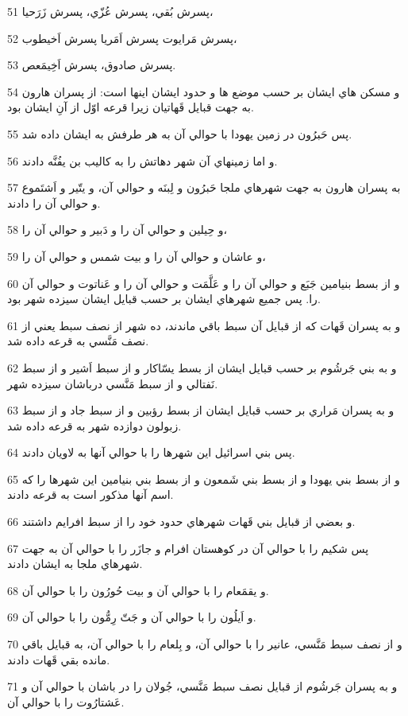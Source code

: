 \par 51 پسرش بُقي، پسرش عُزّي، پسرش زَرَحيا،
\par 52 پسرش مَرايوت پسرش اَمَريا پسرش اَخيطوب،
\par 53 پسرش صادوق، پسرش اَخِيمَعص.
\par 54 و مسکن هاي ايشان بر حسب موضع ها و حدود ايشان اينها است: از پسران هارون به جهت قبايل قَهاتيان زيرا قرعه اوّل از آنِ ايشان بود.
\par 55 پس حَبرُون در زمين يهودا با حوالي آن به هر طرفش به ايشان داده شد.
\par 56 و اما زمينهاي آن شهر دهاتش را به کاليب بن يفُنَّه دادند.
\par 57 به پسران هارون به جهت شهرهاي ملجا حَبرُون و لِبنَه و حوالي آن، و يتّير و اَشتَموع و حوالي آن را دادند.
\par 58 و حِيلين و حوالي آن را و دَبير و حوالي آن را،
\par 59 و عاشان و حوالي آن را و بيت شمس و حوالي آن را،
\par 60 و از بسط بنيامين جَبَع و حوالي آن را و عَلَّمَت و حوالي آن را و عَناتوت و حوالي آن را. پس جميع شهرهاي ايشان بر حسب قبايل ايشان سيزده شهر بود.
\par 61 و به پسران قَهات که از قبايل آن سبط باقي ماندند، ده شهر از نصف سبط يعني از نصف مَنَّسي به قرعه داده شد.
\par 62 و به بني جَرشُوم بر حسب قبايل ايشان از بسط يسّاکار و از سبط اَشير و از سبط نَفتالي و از سبط مَنَّسي درباشان سيزده شهر.
\par 63 و به پسران مَراري بر حسب قبايل ايشان از بسط رؤبين و از سبط جاد و از سبط زبولون دوازده شهر به قرعه داده شد.
\par 64 پس بني اسرائيل اين شهرها را با حوالي آنها به لاويان دادند.
\par 65 و از بسط بني يهودا و از بسط بني شَمعون و از بسط بني بنيامين اين شهرها را که اسم آنها مذکور است به قرعه دادند.
\par 66 و بعضي از قبايل بني قَهات شهرهاي حدود خود را از سبط افرايم داشتند.
\par 67 پس شکيم را با حوالي آن در کوهستان افرام و جازَر را با حوالي آن به جهت شهرهاي ملجا به ايشان دادند.
\par 68 و يقمَعام را با حوالي آن و بيت حُورُون را با حوالي آن.
\par 69 و اَيلُون را با حوالي آن و جَتّ رِمُّون را با حوالي آن.
\par 70 و از نصف سبط مَنَّسي، عانير را با حوالي آن، و بِلعام را با حوالي آن، به قبايل باقي مانده بقي قَهات دادند.
\par 71 و به پسران جَرشُوم از قبايل نصف سبط مَنَّسي، جُولان را در باشان با حوالي آن و عَشتارُوت را با حوالي آن.
